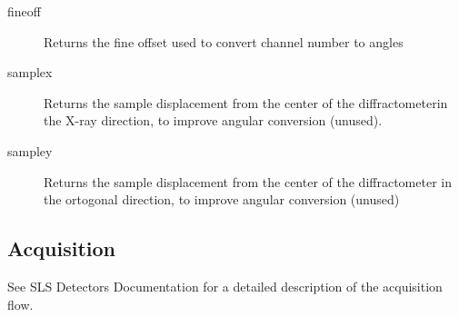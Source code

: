 \documentclass{article}
\begin{document}
\begin{description}
\item[fineoff] Returns the fine offset used to convert channel number to angles
\item[samplex] Returns the sample displacement from the center of the diffractometerin the X-ray direction, to improve angular conversion (unused).
\item[sampley] Returns the sample displacement from the center of the diffractometer in the ortogonal direction, to improve angular conversion (unused)
\end{description}

\subsection{Acquisition}
See SLS Detectors Documentation for a detailed description of the acquisition flow.
\end{document}
